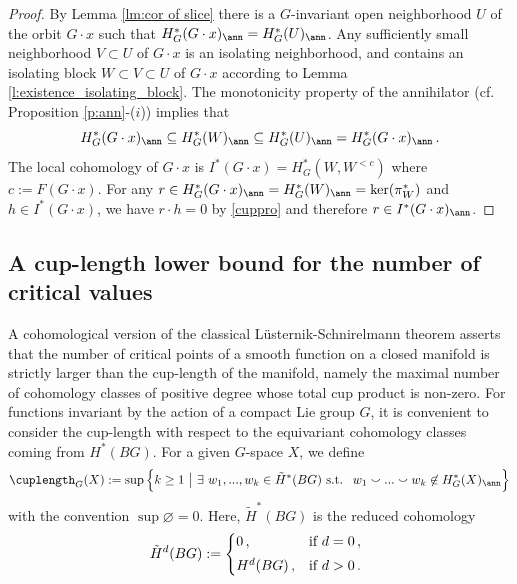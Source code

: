 \documentclass[11pt,a4paper,reqno]{article}
\numberwithin{equation}{section}
\theoremstyle{definition}
\begin{document}
\begin{proof}
By Lemma \ref{lm:cor of slice}
there is a $G$-invariant open neighborhood  $U$ of the orbit $G\cdot x$ such that $H^*_G(G\cdot x)_\ann=H^*_G(U)_\ann $.
Any sufficiently small neighborhood $V\subset U$ of  $G\cdot x $ is an isolating neighborhood, and contains an isolating block $W \subset V \subset U $ of $G\cdot x$ according to Lemma \ref{l:existence_isolating_block}.
The monotonicity property of the annihilator (cf. Proposition \ref{p:ann}-($i$)) implies that 
\[
    H^*_G(G\cdot x)_\ann\subseteq H^*_G(W)_\ann\subseteq H^*_G(U)_\ann=H^*_G(G\cdot x)_\ann\, .    
\]
The  local cohomology of $G\cdot x$ is $I^*(G\cdot x)=H^*_G(W,W^{<c})$ where $c:=F(G\cdot x)$.
For any  $r\in H^*_G(G\cdot x)_\ann 
 = H^*_G (W)_\ann = \ker (\pi_W^* ) $ and $h\in I^*(G\cdot x)$, we have
$ r\cdot h  = 0 $ 
by \eqref{cuppro} 
and therefore $r\in I^*(G\cdot x)_\ann$.
\end{proof}


\subsection{A cup-length lower bound for the number of critical values}

A cohomological version of the classical L\"usternik-Schnirelmann theorem asserts that the number of critical points of a smooth function on a closed manifold is strictly larger than the cup-length of the manifold, namely the maximal number of cohomology classes of positive degree whose total cup product is non-zero. For functions invariant by the action of a compact Lie group $G$, 
it is convenient to consider the cup-length with respect to the equivariant cohomology classes coming from $H^*(BG)$. For a given $G$-space $X$, we define
\begin{equation}\label{def:CL}
\cuplength_G(X)
:=
\sup
\Big\{
k\geq1\ \big|\ 
\exists\ w_1,...,w_k\in \tilde H^{*}(BG)\mbox{ s.t. } \ w_1\smallsmile ...\smallsmile w_k\not\in H^*_G(X)_\ann
\Big\}
\end{equation}
with the convention $\sup\varnothing=0$. Here,
$\tilde H^{*}(BG)$ is the reduced cohomology 
\begin{align}
\label{eq:redho}
\tilde H^d(BG)
:=
\left\{
\begin{array}{@{}ll}
  0 \, ,  &  \mbox{if }d=0 \, ,\vspace{5pt}\\
  H^d(BG) \, ,  & \mbox{if }d>0 \, .
\end{array}
\right.
\end{align}
\end{document}
